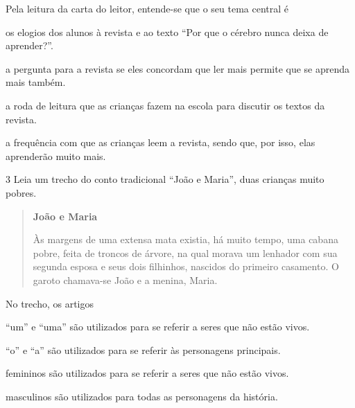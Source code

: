 Pela leitura da carta do leitor, entende-se que o seu tema central é

\begin{escolha}
\item os elogios dos alunos à revista e ao texto ``Por que o cérebro nunca 
deixa de aprender?''.

\item a pergunta para a revista se eles concordam que ler mais permite que
se aprenda mais também.

\item a roda de leitura que as crianças fazem na escola para discutir
os textos da revista.

\item a frequência com que as crianças leem a revista, sendo que, por
isso, elas aprenderão muito mais.
\end{escolha}



\num{3} Leia um trecho do conto tradicional ``João e Maria'', duas crianças muito pobres.

\begin{quote}
\textbf{João e Maria}

Às margens de uma extensa mata existia, há muito tempo, uma cabana
pobre, feita de troncos de árvore, na qual morava um lenhador com sua
segunda esposa e seus dois filhinhos, nascidos do primeiro casamento. 
O garoto chamava-se João e a menina, Maria.

\end{quote}

No trecho, os artigos

\begin{escolha}
\item ``um'' e ``uma'' são utilizados para se referir a seres que não estão vivos.

\item ``o'' e ``a'' são utilizados para se referir às personagens principais.

\item femininos são utilizados para se referir a seres que não estão vivos.

\item masculinos são utilizados para todas as personagens da história.
\end{escolha}

